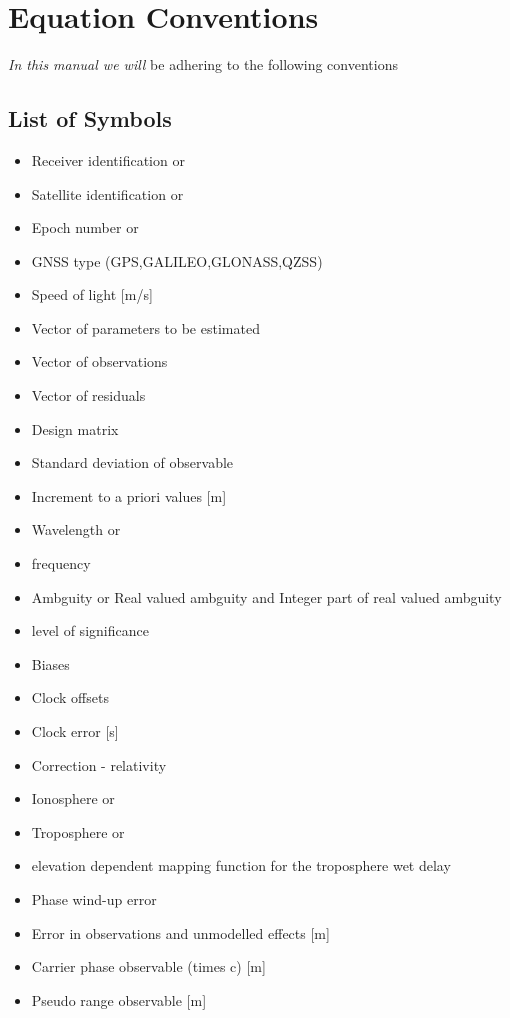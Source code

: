 \chapter{Equation Conventions}
\label{ch:conventions}

\textit{In this manual we will} be adhering to the following conventions

\section{List of Symbols}

\begin{itemize}
	\item {} Receiver identification or {}
	\item {} Satellite identification or {}
	\item {} Epoch number or {}
	\item {} GNSS type (GPS,GALILEO,GLONASS,QZSS)
	\item {} Speed of light [m/s]
	\item {} Vector of parameters to be estimated
	\item {} Vector of observations
	\item {} Vector of residuals
	\item {} Design matrix
	\item {\boldmath{$\sigma$}} Standard deviation of observable
	\item {\boldmath{$\Delta$}} Increment to a priori values [m]
	\item {\boldmath{$\lambda$}} Wavelength or {}
	\item {} frequency
	\item {\boldmath{$\alpha$}} Ambguity or {} Real valued ambguity and {} Integer part of real valued ambguity
	\item {\boldmath{$\alpha$}} level of significance
	
	\item {\boldmath{$\beta$}} Biases
	\item {\boldmath{$\zeta$}} Clock offsets
	\item {} Clock error [s]
	\item {\boldmath{$\kappa$}} Correction - relativity
	\item {\boldmath{$\iota$}} Ionosphere or  {}
	\item {\boldmath{$\tau$}} Troposphere or {}
	\item {} elevation dependent mapping function for the troposphere wet delay
	\item {\boldmath{$\xi$}} Phase wind-up error
	\item {\boldmath{$\epsilon$}} Error in observations and unmodelled effects [m]
	\item {} Carrier phase observable (times c) [m]
	\item {} Pseudo range observable [m]
		

\end{itemize}
